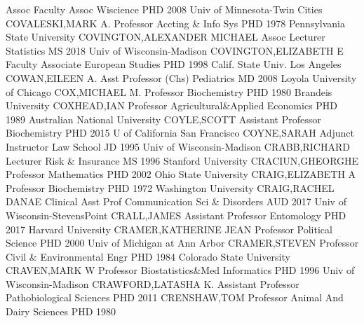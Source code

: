 \documentclass[
]{article}
\begin{document}
\textbar Assoc Faculty Assoc \textbar Wiscience \textbar PHD 2008 Univ
of Minnesota-Twin Cities \textbar COVALESKI,MARK A. \textbar{}
 \textbar Professor \textbar Accting \& Info Sys \textbar PHD
1978 Pennsylvania State University \textbar COVINGTON,ALEXANDER MICHAEL
\textbar{}  \textbar Assoc Lecturer \textbar Statistics
\textbar MS 2018 Univ of Wisconsin-Madison \textbar COVINGTON,ELIZABETH
E \textbar{}  \textbar Faculty Associate \textbar European
Studies \textbar PHD 1998 Calif. State Univ. Los Angeles
\textbar COWAN,EILEEN A. \textbar{}  \textbar Asst Professor
(Chs) \textbar Pediatrics \textbar MD 2008 Loyola University of Chicago
\textbar COX,MICHAEL M. \textbar{}  \textbar Professor
\textbar Biochemistry \textbar PHD 1980 Brandeis University
\textbar COXHEAD,IAN \textbar{}  \textbar Professor
\textbar Agricultural\&Applied Economics \textbar PHD 1989 Australian
National University \textbar COYLE,SCOTT \textbar{} 
\textbar Assistant Professor \textbar Biochemistry \textbar PHD 2015 U
of California San Francisco \textbar COYNE,SARAH \textbar{} 
\textbar Adjunct Instructor \textbar Law School \textbar JD 1995 Univ of
Wisconsin-Madison \textbar CRABB,RICHARD \textbar{} 
\textbar Lecturer \textbar Risk \& Insurance \textbar MS 1996 Stanford
University \textbar CRACIUN,GHEORGHE \textbar{} 
\textbar Professor \textbar Mathematics \textbar PHD 2002 Ohio State
University \textbar CRAIG,ELIZABETH A \textbar{} 
\textbar Professor \textbar Biochemistry \textbar PHD 1972 Washington
University \textbar CRAIG,RACHEL DANAE \textbar{} 
\textbar Clinical Asst Prof \textbar Communication Sci \& Disorders
\textbar AUD 2017 Univ of Wisconsin-StevensPoint \textbar CRALL,JAMES
\textbar{}  \textbar Assistant Professor \textbar Entomology
\textbar PHD 2017 Harvard University \textbar CRAMER,KATHERINE JEAN
\textbar{}  \textbar Professor \textbar Political Science
\textbar PHD 2000 Univ of Michigan at Ann Arbor \textbar CRAMER,STEVEN
\textbar{}  \textbar Professor \textbar Civil \&
Environmental Engr \textbar PHD 1984 Colorado State University
\textbar CRAVEN,MARK W \textbar{}  \textbar Professor
\textbar Biostatistics\&Med Informatics \textbar PHD 1996 Univ of
Wisconsin-Madison \textbar CRAWFORD,LATASHA K. \textbar{} 
\textbar Assistant Professor \textbar Pathobiological Sciences
\textbar PHD 2011 \textbar CRENSHAW,TOM \textbar{} 
\textbar Professor \textbar Animal And Dairy Sciences \textbar PHD 1980
\end{document}
